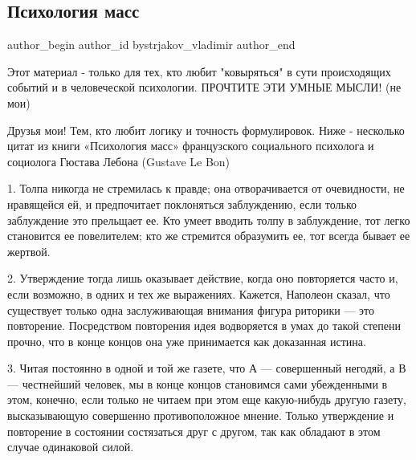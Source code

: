  
 
 
 
 
 
\subsection{Психология масс}
\label{sec:12_01_2021.fb.bystrjakov_vladimir.1.psihologia_tolpy}
 
\ifcmt
 author_begin
   author_id bystrjakov_vladimir
 author_end
\fi


Этот материал - только для тех, кто любит "ковыряться" в сути происходящих
событий и в человеческой психологии. ПРОЧТИТЕ ЭТИ УМНЫЕ МЫСЛИ! (не мои)

Друзья мои! Тем, кто любит логику и точность формулировок. Ниже - несколько
цитат из книги «Психология масс» французского социального психолога и социолога
Гюстава Лебона (Gustave Le Bon)

1. Толпа никогда не стремилась к правде; она отворачивается от очевидности, не
нравящейся ей, и предпочитает поклоняться заблуждению, если только заблуждение
это прельщает ее. Кто умеет вводить толпу в заблуждение, тот легко становится
ее повелителем; кто же стремится образумить ее, тот всегда бывает ее жертвой.

2. Утверждение тогда лишь оказывает действие, когда оно повторяется часто и,
если возможно, в одних и тех же выражениях. Кажется, Наполеон сказал, что
существует только одна заслуживающая внимания фигура риторики — это повторение.
Посредством повторения идея водворяется в умах до такой степени прочно, что в
конце концов она уже принимается как доказанная истина.

3. Читая постоянно в одной и той же газете, что А — совершенный негодяй, а В —
честнейший человек, мы в конце концов становимся сами убежденными в этом,
конечно, если только не читаем при этом еще какую-нибудь другую газету,
высказывающую совершенно противоположное мнение. Только утверждение и
повторение в состоянии состязаться друг с другом, так как обладают в этом
случае одинаковой силой.

